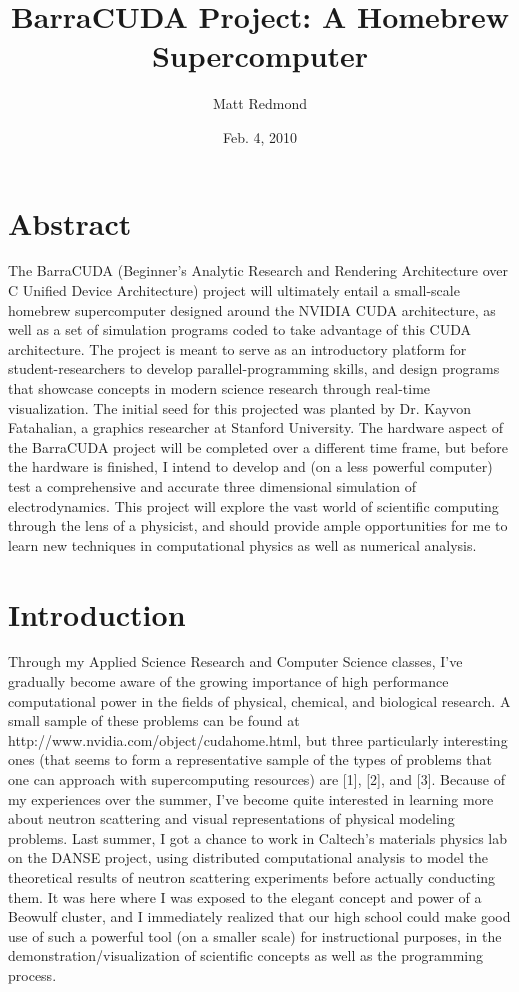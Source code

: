 \documentclass[10pt]{article}
\title{BarraCUDA Project: A Homebrew Supercomputer}
\author{Matt Redmond}
\date{Feb. 4, 2010}
\begin{document}
\maketitle
\tableofcontents
\clearpage

\section{Abstract}
The BarraCUDA (Beginner's Analytic Research and Rendering Architecture over C Unified Device Architecture) project will ultimately entail a small-scale homebrew supercomputer designed around the NVIDIA CUDA architecture, as well as a set of simulation programs coded to take advantage of this CUDA architecture. The project is meant to serve as an introductory platform for student-researchers to develop parallel-programming skills, and design programs that showcase concepts in modern science research through real-time visualization. The initial seed for this projected was planted by Dr. Kayvon Fatahalian, a graphics researcher at Stanford University. The hardware aspect of the BarraCUDA project will be completed over a different time frame, but before the hardware is finished, I intend to develop and (on a less powerful computer) test a comprehensive and accurate three dimensional simulation of electrodynamics. This project will explore the vast world of scientific computing through the lens of a physicist, and should provide ample opportunities for me to learn new techniques in computational physics as well as numerical analysis.

\section{Introduction} %
Through my Applied Science Research and Computer Science classes, I've gradually become aware of the growing importance of high performance computational power in the fields of physical, chemical, and biological research. A small sample of these problems can be found at http://www.nvidia.com/object/cudahome.html, but three particularly interesting ones (that seems to form a representative sample of the types of problems that one can approach with supercomputing resources) are [1], [2], and [3]. Because of my experiences over the summer, I've become quite interested in learning more about neutron scattering and visual representations of physical modeling problems. Last summer, I got a chance to work in Caltech's materials physics lab on the DANSE project, using distributed computational analysis to model the theoretical results of neutron scattering experiments before actually conducting them. It was here where I was exposed to the elegant concept and power of a Beowulf cluster, and I immediately realized that our high school could make good use of such a powerful tool (on a smaller scale) for instructional purposes, in the demonstration/visualization of scientific concepts as well as the programming process.
\end{document}
